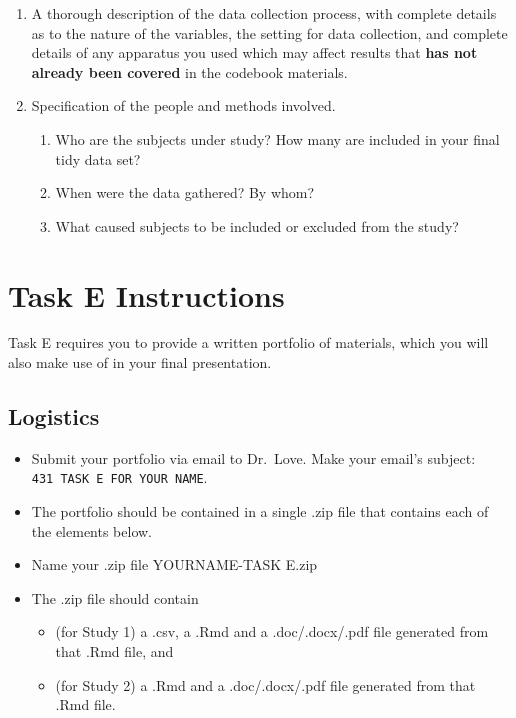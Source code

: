 \documentclass[]{book}
\providecommand{\tightlist}{%
  \setlength{\itemsep}{0pt}\setlength{\parskip}{0pt}}
\theoremstyle{definition}
\theoremstyle{definition}
\theoremstyle{definition}
\theoremstyle{remark}
\begin{document}
\begin{enumerate}
\def\labelenumi{\arabic{enumi}.}
\setcounter{enumi}{1}
\item
  A thorough description of the data collection process, with complete
  details as to the nature of the variables, the setting for data
  collection, and complete details of any apparatus you used which may
  affect results that \textbf{has not already been covered} in the
  codebook materials.
\item
  Specification of the people and methods involved.

  \begin{enumerate}
  \def\labelenumii{\alph{enumii}.}
  \tightlist
  \item
    Who are the subjects under study? How many are included in your
    final tidy data set?
  \item
    When were the data gathered? By whom?
  \item
    What caused subjects to be included or excluded from the study?
  \end{enumerate}
\end{enumerate}

\hypertarget{task-e-instructions}{%
\chapter{Task E Instructions}\label{task-e-instructions}}

Task E requires you to provide a written portfolio of materials, which
you will also make use of in your final presentation.

\hypertarget{logistics}{%
\section{Logistics}\label{logistics}}

\begin{itemize}
\tightlist
\item
  Submit your portfolio via email to Dr.~Love. Make your email's
  subject: \texttt{431\ TASK\ E\ FOR\ YOUR\ NAME}.
\item
  The portfolio should be contained in a single .zip file that contains
  each of the elements below.
\item
  Name your .zip file YOURNAME-TASK E.zip
\item
  The .zip file should contain

  \begin{itemize}
  \tightlist
  \item
    (for Study 1) a .csv, a .Rmd and a .doc/.docx/.pdf file generated
    from that .Rmd file, and
  \item
    (for Study 2) a .Rmd and a .doc/.docx/.pdf file generated from that
    .Rmd file.
  \end{itemize}
\end{itemize}
\end{document}

